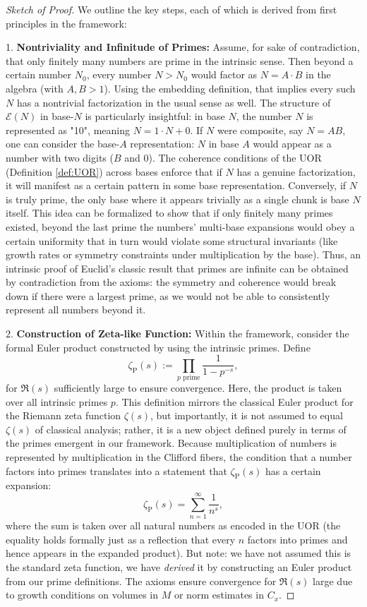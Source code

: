 \documentclass[11pt]{article}
\begin{document}
\begin{proof}[Sketch of Proof]
We outline the key steps, each of which is derived from first principles in the framework:

1. \textbf{Nontriviality and Infinitude of Primes:} Assume, for sake of contradiction, that only finitely many numbers are prime in the intrinsic sense. Then beyond a certain number $N_0$, every number $N > N_0$ would factor as $N = A \cdot B$ in the algebra (with $A, B > 1$). Using the embedding definition, that implies every such $N$ has a nontrivial factorization in the usual sense as well. The structure of $\mathcal{E}(N)$ in base-$N$ is particularly insightful: in base $N$, the number $N$ is represented as "10", meaning $N = 1 \cdot N + 0$. If $N$ were composite, say $N = A B$, one can consider the base-$A$ representation: $N$ in base $A$ would appear as a number with two digits ($B$ and 0). The coherence conditions of the UOR (Definition \ref{def:UOR}) across bases enforce that if $N$ has a genuine factorization, it will manifest as a certain pattern in some base representation. Conversely, if $N$ is truly prime, the only base where it appears trivially as a single chunk is base $N$ itself. This idea can be formalized to show that if only finitely many primes existed, beyond the last prime the numbers' multi-base expansions would obey a certain uniformity that in turn would violate some structural invariants (like growth rates or symmetry constraints under multiplication by the base). Thus, an intrinsic proof of Euclid's classic result that primes are infinite can be obtained by contradiction from the axioms: the symmetry and coherence would break down if there were a largest prime, as we would not be able to consistently represent all numbers beyond it.

2. \textbf{Construction of Zeta-like Function:} Within the framework, consider the formal Euler product constructed by using the intrinsic primes. Define 
\[
\zeta_{\mathrm{P}}(s) := \prod_{p \text{ prime}} \frac{1}{1 - p^{-s}},
\] 
for $\Re(s)$ sufficiently large to ensure convergence. Here, the product is taken over all intrinsic primes $p$. This definition mirrors the classical Euler product for the Riemann zeta function $\zeta(s)$, but importantly, it is not assumed to equal $\zeta(s)$ of classical analysis; rather, it is a new object defined purely in terms of the primes emergent in our framework. Because multiplication of numbers is represented by multiplication in the Clifford fibers, the condition that a number factors into primes translates into a statement that $\zeta_{\mathrm{P}}(s)$ has a certain expansion:
\[
\zeta_{\mathrm{P}}(s) = \sum_{n=1}^\infty \frac{1}{n^s},
\] 
where the sum is taken over all natural numbers as encoded in the UOR (the equality holds formally just as a reflection that every $n$ factors into primes and hence appears in the expanded product). But note: we have not assumed this is the standard zeta function, we have \emph{derived} it by constructing an Euler product from our prime definitions. The axioms ensure convergence for $\Re(s)$ large due to growth conditions on volumes in $M$ or norm estimates in $C_x$.


\end{proof}
\end{document}
